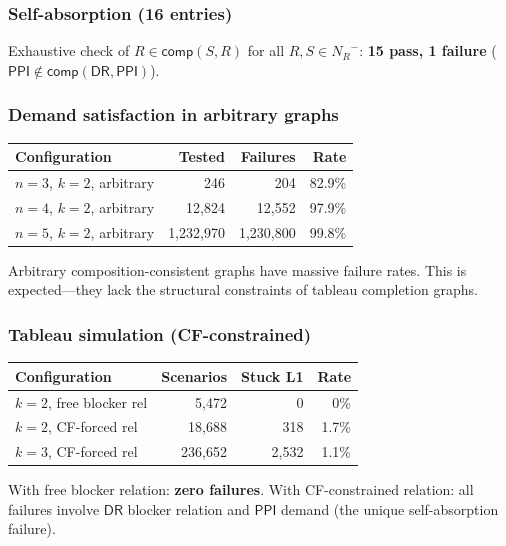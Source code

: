 \documentclass[a4paper,11pt]{article}
\theoremstyle{definition}
\newcommand{\NR}{\ensuremath{N_R}}
\newcommand{\DR}{\ensuremath{\mathsf{DR}}}
\newcommand{\PPI}{\ensuremath{\mathsf{PPI}}}
\newcommand{\comp}{\ensuremath{\mathsf{comp}}}
\begin{document}
\subsubsection{Self-absorption (16 entries)}
Exhaustive check of $R \in \comp(S, R)$ for all $R, S \in \NR^{-}$:
\textbf{15 pass, 1 failure} ($\PPI \notin \comp(\DR, \PPI)$).

\subsubsection{Demand satisfaction in arbitrary graphs}

\begin{center}
\renewcommand{\arraystretch}{1.2}
\begin{tabular}{lrrr}
\toprule
\textbf{Configuration} & \textbf{Tested} & \textbf{Failures} & \textbf{Rate} \\
\midrule
$n{=}3$, $k{=}2$, arbitrary & 246 & 204 & 82.9\% \\
$n{=}4$, $k{=}2$, arbitrary & 12,824 & 12,552 & 97.9\% \\
$n{=}5$, $k{=}2$, arbitrary & 1,232,970 & 1,230,800 & 99.8\% \\
\bottomrule
\end{tabular}
\end{center}

Arbitrary composition-consistent graphs have massive failure rates.
This is expected---they lack the structural constraints of tableau
completion graphs.

\subsubsection{Tableau simulation (CF-constrained)}

\begin{center}
\renewcommand{\arraystretch}{1.2}
\begin{tabular}{lrrr}
\toprule
\textbf{Configuration} & \textbf{Scenarios} & \textbf{Stuck L1} & \textbf{Rate} \\
\midrule
$k{=}2$, free blocker rel & 5,472 & 0 & 0\% \\
$k{=}2$, CF-forced rel & 18,688 & 318 & 1.7\% \\
$k{=}3$, CF-forced rel & 236,652 & 2,532 & 1.1\% \\
\bottomrule
\end{tabular}
\end{center}

With free blocker relation: \textbf{zero failures}.  With
CF-constrained relation: all failures involve $\DR$ blocker
relation and $\PPI$ demand (the unique self-absorption failure).
\end{document}
